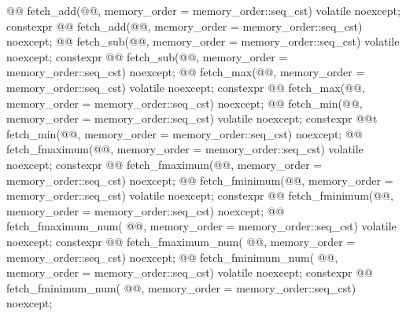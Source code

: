 \begin{codeblock}
{{    @@ fetch_add(@@,
                                  memory_order = memory_order::seq_cst) volatile noexcept;
    constexpr @@ fetch_add(@@,
                                            memory_order = memory_order::seq_cst) noexcept;
    @@ fetch_sub(@@,
                                  memory_order = memory_order::seq_cst) volatile noexcept;
    constexpr @@ fetch_sub(@@,
                                            memory_order = memory_order::seq_cst) noexcept;
    @@ fetch_max(@@,
                                  memory_order = memory_order::seq_cst) volatile noexcept;
    constexpr @@ fetch_max(@@,
                                            memory_order = memory_order::seq_cst) noexcept;
    @@ fetch_min(@@,
                                  memory_order = memory_order::seq_cst) volatile noexcept;
    constexpr @@t fetch_min(@@,
                                            memory_order = memory_order::seq_cst) noexcept;
    @@ fetch_fmaximum(@@,
                                       memory_order = memory_order::seq_cst) volatile noexcept;
    constexpr @@ fetch_fmaximum(@@,
                                                 memory_order = memory_order::seq_cst) noexcept;
    @@ fetch_fminimum(@@,
                                       memory_order = memory_order::seq_cst) volatile noexcept;
    constexpr @@ fetch_fminimum(@@,
                                                 memory_order = memory_order::seq_cst) noexcept;
    @@ fetch_fmaximum_num(
      @@, memory_order = memory_order::seq_cst) volatile noexcept;
    constexpr @@ fetch_fmaximum_num(
      @@, memory_order = memory_order::seq_cst) noexcept;
    @@ fetch_fminimum_num(
      @@, memory_order = memory_order::seq_cst) volatile noexcept;
    constexpr @@ fetch_fminimum_num(
      @@, memory_order = memory_order::seq_cst) noexcept;

}}
\end{codeblock}
